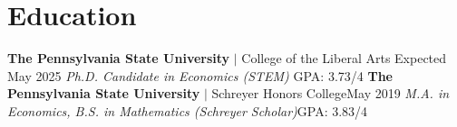 \section{Education}
  \resumeSubHeadingListStart
  \resumeSubSubheading
  {\textbf{The Pennsylvania State University} $|$ College of the Liberal Arts }{Expected May 2025}
  \resumeSubSubheading
  {\emph{Ph.D. Candidate in Economics (STEM)} }{GPA: 3.73/4}
      \resumeItemListStart
      \resumeItemListEnd
      \resumeSubSubheading
  {\textbf{The Pennsylvania State University} $|$ Schreyer Honors College}{May 2019}
  \resumeSubSubheading
  {\emph{M.A. in Economics, B.S. in Mathematics (Schreyer Scholar)}}{GPA: 3.83/4}
    \resumeSubHeadingListEnd